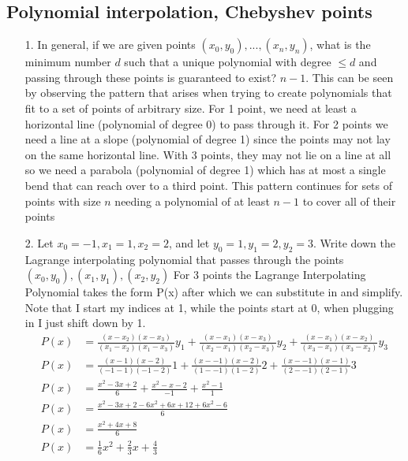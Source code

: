 \documentclass{article}
\begin{document}
\newpage
\subsection{Polynomial interpolation, Chebyshev points}
\begin{itemize}
    \item[1.] In general, if we are given points $(x_0, y_0), ...,(x_n, y_n)$, what is the minimum number $d$ such that a unique polynomial with degree $\leq d$ and passing through these points is guaranteed to exist?
    \newline\newline
    $n-1$. This can be seen by observing the pattern that arises when trying to create polynomials that fit to a set of points of arbitrary size. For 1 point, we need at least a horizontal line (polynomial of degree 0) to pass through it. For 2 points we need a line at a slope (polynomial of degree 1) since the points may not lay on the same horizontal line. With 3 points, they may not lie on a line at all so we need a parabola (polynomial of degree 1) which has at most a single bend that can reach over to a third point. This pattern continues for sets of points with size $n$ needing a polynomial of at least $n - 1$ to cover all of their points
    \item[2.] Let $x_0 = -1, x_1 = 1, x_2 = 2$, and let $y_0 = 1, y_1 = 2, y_2 = 3$. Write down the Lagrange interpolating polynomial that passes through the points $(x_0, y_0),(x_1, y_1),(x_2, y_2)$
    \newline\newline
    For 3 points the Lagrange Interpolating Polynomial takes the form P(x) after which we can substitute in and simplify. Note that I start my indices at 1, while the points start at 0, when plugging in I just shift down by 1. 
    \begin{align*}
        P(x) &= \frac{(x-x_2)(x-x_3)}{(x_1-x_2)(x_1-x_3)}y_1 + \frac{(x-x_1)(x-x_3)}{(x_2-x_1)(x_2-x_3)}y_2 + \frac{(x-x_1)(x-x_2)}{(x_3-x_1)(x_3-x_2)}y_3 \\
        P(x) &= \frac{(x-1)(x-2)}{(-1-1)(-1-2)}1 + \frac{(x--1)(x-2)}{(1--1)(1-2)}2+ \frac{(x--1)(x-1)}{(2--1)(2-1)}3\\
        P(x) &= \frac{x^2-3x+2}{6} + \frac{x^2-x-2}{-1}+ \frac{x^2-1}{1}\\
        P(x) &= \frac{x^2-3x+2-6x^2+6x+12+6x^2-6}{6}\\
        P(x) &= \frac{x^2+4x+8}{6}\\
        P(x) &= \frac{1}{6}x^2 +\frac{2}{3}x+\frac{4}{3} \\
    \end{align*}
    

\end{itemize}
\end{document}
